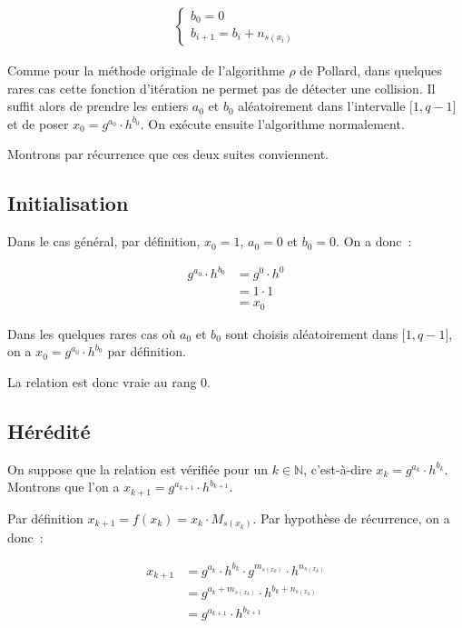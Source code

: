     \begin{align*}
      \begin{cases}
        b_0 = 0 \\
        b_{i+1} = b_i + n_{s(x_i)}
      \end{cases}
    \end{align*}

		Comme pour la méthode originale de l'algorithme $\rho$ de Pollard, dans quelques rares cas cette fonction d'itération ne permet pas de détecter une collision. Il suffit alors de prendre les entiers $a_0$ et $b_0$ aléatoirement dans l'intervalle $\mathopen{[}1,q-1\mathclose{]}$ et de poser $x_0 = g^{a_0} \cdot h^{b_0}$. On exécute ensuite l'algorithme normalement.

		Montrons par récurrence que ces deux suites conviennent.

		\subsection*{Initialisation}

		Dans le cas général, par définition, $x_0 = 1$, $a_0 = 0$ et $b_0 = 0$. On a donc~:

		\begin{align*}
          g^{a_0} \cdot h^{b_0} &= g^{0} \cdot h^{0} \\
                                &= 1 \cdot 1 \\
                                &= x_0
        \end{align*}

        Dans les quelques rares cas où $a_0$ et $b_0$ sont choisis aléatoirement dans $\mathopen{[}1,q-1\mathclose{]}$, on a $x_0 = g^{a_0} \cdot h^{b_0}$ par définition.

        La relation est donc vraie au rang $0$.

        \subsection*{Hérédité}
        On suppose que la relation est vérifiée pour un $k \in \mathbb{N}$, c'est-à-dire $x_k = g^{a_k} \cdot h^{b_k}$. Montrons que l'on a $x_{k+1} = g^{a_{k+1}} \cdot h^{b_{k+1}}$.

        Par définition $x_{k+1} = f(x_k) = x_k \cdot M_{s(x_k)}$. Par hypothèse de récurrence, on a donc~:

       \begin{align*}
          x_{k+1} &= g^{a_k} \cdot h^{b_k} \cdot g^{m_{s(x_k)}} \cdot h^{n_{s(x_k)}} \\
                  &= g^{a_k + m_{s(x_k)}} \cdot h^{b_k + n_{s(x_k)}} \\
                  &=g^{a_{k+1}} \cdot h^{b_{k+1}}
        \end{align*}

